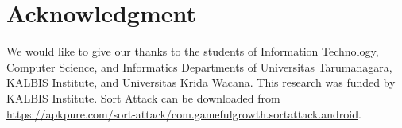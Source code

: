 \documentclass[conference]{IEEEtran}
\begin{document}
\section*{Acknowledgment}

We would like to give our thanks to the students of Information Technology, Computer Science, and Informatics Departments of Universitas Tarumanagara, KALBIS Institute, and Universitas Krida Wacana. This research was funded by KALBIS Institute. Sort Attack can be downloaded from \url{https://apkpure.com/sort-attack/com.gamefulgrowth.sortattack.android}.



\end{document}
